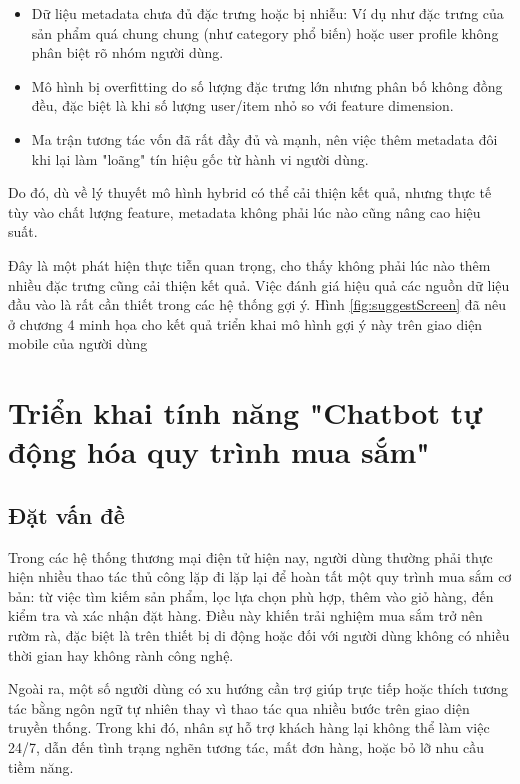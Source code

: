 \documentclass[../DoAn.tex]{subfiles}
\begin{document}
\begin{itemize}
    \item Dữ liệu metadata chưa đủ đặc trưng hoặc bị nhiễu: Ví dụ như đặc trưng của sản phẩm quá chung chung (như category phổ biến) hoặc user profile không phân biệt rõ nhóm người dùng.
    \item Mô hình bị overfitting do số lượng đặc trưng lớn nhưng phân bố không đồng đều, đặc biệt là khi số lượng user/item nhỏ so với feature dimension.
    \item Ma trận tương tác vốn đã rất đầy đủ và mạnh, nên việc thêm metadata đôi khi lại làm "loãng" tín hiệu gốc từ hành vi người dùng.
\end{itemize}
Do đó, dù về lý thuyết mô hình hybrid có thể cải thiện kết quả, nhưng thực tế tùy vào chất lượng feature, metadata không phải lúc nào cũng nâng cao hiệu suất.

 Đây là một phát hiện thực tiễn quan trọng, cho thấy không phải lúc nào thêm nhiều đặc trưng cũng cải thiện kết quả. Việc đánh giá hiệu quả các nguồn dữ liệu đầu vào là rất cần thiết trong các hệ thống gợi ý.
 Hình \ref{fig:suggestScreen} đã nêu ở chương 4 minh họa cho kết quả triển khai mô hình gợi ý này trên giao diện mobile của người dùng

\section{Triển khai tính năng "Chatbot tự động hóa quy trình mua sắm"}

\subsection{Đặt vấn đề}

Trong các hệ thống thương mại điện tử hiện nay, người dùng thường phải thực hiện nhiều thao tác thủ công lặp đi lặp lại để hoàn tất một quy trình mua sắm cơ bản: từ việc tìm kiếm sản phẩm, lọc lựa chọn phù hợp, thêm vào giỏ hàng, đến kiểm tra và xác nhận đặt hàng. Điều này khiến trải nghiệm mua sắm trở nên rườm rà, đặc biệt là trên thiết bị di động hoặc đối với người dùng không có nhiều thời gian hay không rành công nghệ.

Ngoài ra, một số người dùng có xu hướng cần trợ giúp trực tiếp hoặc thích tương tác bằng ngôn ngữ tự nhiên thay vì thao tác qua nhiều bước trên giao diện truyền thống. Trong khi đó, nhân sự hỗ trợ khách hàng lại không thể làm việc 24/7, dẫn đến tình trạng nghẽn tương tác, mất đơn hàng, hoặc bỏ lỡ nhu cầu tiềm năng.
\end{document}

